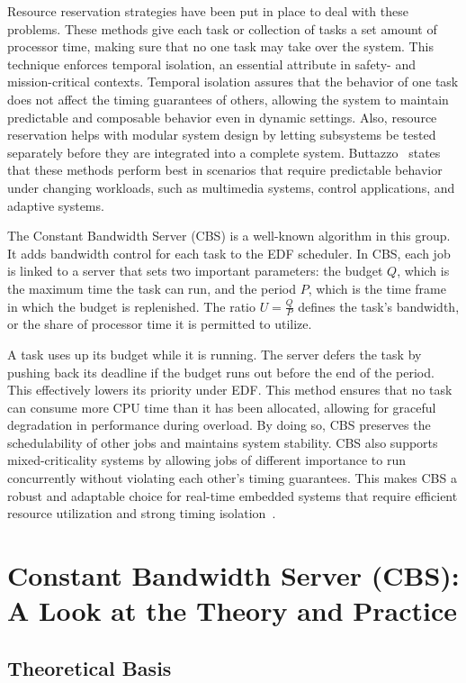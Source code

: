 \documentclass[conference]{IEEEtran}
\begin{document}
Resource reservation strategies have been put in place to deal with these problems. These methods give each task or collection of tasks a set amount of processor time, making sure that no one task may take over the system. This technique enforces temporal isolation, an essential attribute in safety- and mission-critical contexts. Temporal isolation assures that the behavior of one task does not affect the timing guarantees of others, allowing the system to maintain predictable and composable behavior even in dynamic settings. Also, resource reservation helps with modular system design by letting subsystems be tested separately before they are integrated into a complete system. Buttazzo~\cite{buttazzo2011hard} states that these methods perform best in scenarios that require predictable behavior under changing workloads, such as multimedia systems, control applications, and adaptive systems.

The Constant Bandwidth Server (CBS) is a well-known algorithm in this group. It adds bandwidth control for each task to the EDF scheduler. In CBS, each job is linked to a server that sets two important parameters: the budget $Q$, which is the maximum time the task can run, and the period $P$, which is the time frame in which the budget is replenished. The ratio $U = \frac{Q}{P}$ defines the task’s bandwidth, or the share of processor time it is permitted to utilize.

A task uses up its budget while it is running. The server defers the task by pushing back its deadline if the budget runs out before the end of the period. This effectively lowers its priority under EDF. This method ensures that no task can consume more CPU time than it has been allocated, allowing for graceful degradation in performance during overload. By doing so, CBS preserves the schedulability of other jobs and maintains system stability. CBS also supports mixed-criticality systems by allowing jobs of different importance to run concurrently without violating each other's timing guarantees. This makes CBS a robust and adaptable choice for real-time embedded systems that require efficient resource utilization and strong timing isolation~\cite{baruah2004dynamic}.


\section{Constant Bandwidth Server (CBS): A Look at the Theory and Practice}

\subsection{Theoretical Basis}
\end{document}
